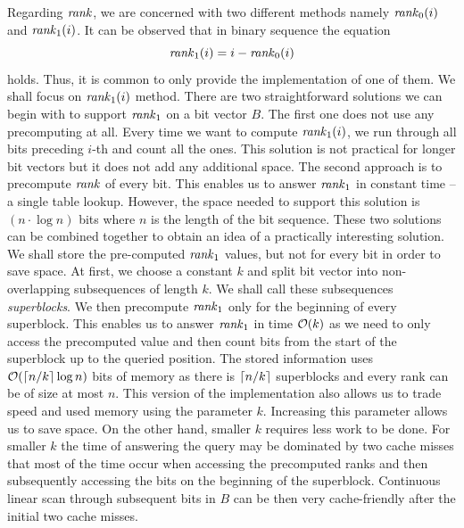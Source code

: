 Regarding $\mathit{rank}$, we are concerned with two different methods namely $\mathit{rank}_0(i)$
and $\mathit{rank}_1(i)$. It can be observed that in binary sequence the equation
$$\mathit{rank}_1(i) = i - \mathit{rank}_0(i)$$ holds. Thus, it is common to only provide
the implementation of one of them. We shall focus on $\mathit{rank}_1(i)$ method. There are two
straightforward solutions we can begin with to support $\mathit{rank}_1$ on a bit vector
$B$. The first one does not use any precomputing at all. Every time we want
to compute $\mathit{rank}_1(i)$, we run through all bits preceding $i$-th and count all
the ones. This solution is not practical for longer bit vectors but it does not
add any additional space. The second approach is to precompute $\mathit{rank}$ of every
bit. This enables us to answer $\mathit{rank}_1$ in constant time -- a single table lookup.
However, the space needed to support this solution is $(n\cdot\log n)$ bits where
$n$ is the length of the bit sequence. These two solutions can be combined together
to obtain an idea of a practically interesting solution. We shall store the
pre-computed $\mathit{rank}_1$ values, but not for every bit in order to save space. At first,
we choose a constant $k$ and split bit vector into non-overlapping subsequences of length
$k$. We shall call these subsequences \textit{superblocks}. We then precompute $\mathit{rank}_1$
only for the beginning of every superblock. This enables us to answer $\mathit{rank}_1$ in time $\mathcal{O}(k)$
as we need to only access the precomputed value and then count bits from the start of the
superblock up to the queried position. The stored information uses $\mathcal{O}(\left\lceil n/k \right\rceil\log n)$
bits of memory as there is $\left\lceil n/k \right\rceil$ superblocks and every rank can be of size at most $n$.
This version of the implementation also allows us to trade speed and used memory using the parameter
$k$. Increasing this parameter allows us to save space. On the other hand, smaller $k$
requires less work to be done. For smaller $k$ the time of answering the query may be
dominated by two cache misses that most of the time occur when accessing the precomputed ranks
and then subsequently accessing the bits on the beginning of the superblock. Continuous linear
scan through subsequent bits in $B$ can be then very cache-friendly after the initial two cache misses.


